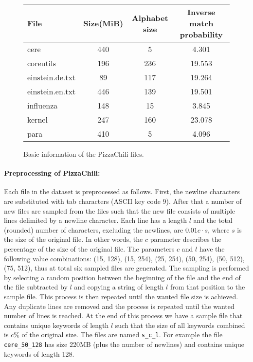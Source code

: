 \documentclass[english,twoside,censored,csm,algorithms-track-2020]{HYthesisML}
\theoremstyle{plain}
\theoremstyle{definition}
\numberwithin{testexample}{chapter}
\begin{document}
\begin{figure}
\begin{center}
  \begin{tabular}{|l|c|c|c|}
    \hline
    \textbf{File} & \textbf{Size(MiB)} & \textbf{Alphabet size} & \textbf{Inverse match probability} \\
    \hline
    cere & 440 & 5 & 4.301 \\
    coreutils & 196 & 236 & 19.553 \\
    einstein.de.txt & 89 & 117 & 19.264 \\
    einstein.en.txt & 446 & 139 & 19.501 \\
    influenza & 148 & 15 & 3.845 \\
    kernel & 247 & 160 & 23.078 \\
    para & 410 & 5 & 4.096\\
    \hline
  \end{tabular}
  \caption{Basic information of the PizzaChili files. \citep{PizzaChili}}
  \label{tbl-pizzachili-info}
\end{center}
\end{figure}


\paragraph{Preprocessing of PizzaChili:}
Each file in the dataset is preprocessed as follows. First, the newline characters are substituted
with tab characters (ASCII key code 9). After that a number of new files are sampled from the files
such that the new file consists of multiple lines delimited by a newline character. Each line has a
length $l$ and the total (rounded) number of characters, excluding the newlines, are $0.01c\cdot s$,
where $s$ is the size of the original file. In other words, the $c$ parameter describes the percentage
of the size of the original file. The parameters $c$ and $l$ have the following value
combinations: (15, 128), (15, 254), (25, 254), (50, 254), (50, 512), (75, 512), thus at total six
sampled files are generated. The sampling is performed by selecting a random position between
the beginning of the file and the end of the file subtracted by $l$ and copying a string of length
$l$ from that position to the sample file. This process is then repeated until the wanted file size is
achieved. Any duplicate lines are removed and the process is repeated until the wanted
number of lines is reached. At the end of this process we have a sample file that contains unique keywords of length
$l$ such that the size of all keywords combined is $c\%$ of the original size. The files are
named \texttt{s\_c\_l}. For example the file \texttt{cere\_50\_128} has size 220MB
(plus the number of newlines) and contains unique keywords of length 128.
\end{document}
